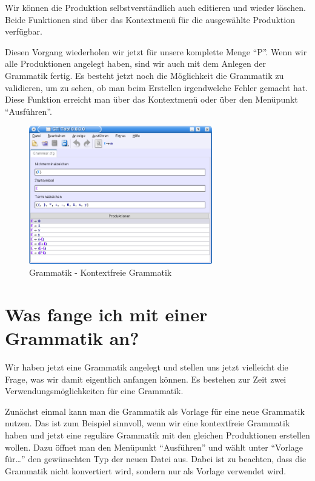 Wir können die Produktion selbstverständlich auch editieren und wieder löschen.
Beide Funktionen sind über das Kontextmenü für die ausgewählte Produktion
verfügbar.\vspace{10pt}

Diesen Vorgang wiederholen wir jetzt für unsere komplette Menge "`P"'. Wenn wir
alle Produktionen angelegt haben, sind wir auch mit dem Anlegen der Grammatik
fertig. Es besteht jetzt noch die Möglichkeit die Grammatik zu validieren, um
zu sehen, ob man beim Erstellen irgendwelche Fehler gemacht hat. Diese Funktion
erreicht man über das Kontextmenü oder über den Menüpunkt "`Ausführen"'.

\begin{figure}[h]
\begin{center}
\includegraphics[width=8cm]{../images/cfg_example.png}
\caption{Grammatik - Kontextfreie Grammatik}
\end{center}
\end{figure}

\section{Was fange ich mit einer Grammatik an?}

Wir haben jetzt eine Grammatik angelegt und stellen uns jetzt vielleicht die
Frage, was wir damit eigentlich anfangen können. Es bestehen zur Zeit zwei
Verwendungsmöglichkeiten für eine Grammatik.\vspace{10pt}

Zunächst einmal kann man die Grammatik als Vorlage für eine neue Grammatik
nutzen. Das ist zum Beispiel sinnvoll, wenn wir eine kontextfreie Grammatik
haben und jetzt eine reguläre Grammatik mit den gleichen Produktionen
erstellen wollen. Dazu öffnet man den Menüpunkt "`Ausführen"' und wählt unter
"`Vorlage für\ldots"' den gewünschten Typ der neuen Datei aus.
Dabei ist zu beachten, dass die Grammatik nicht konvertiert wird,
sondern nur als Vorlage verwendet wird.\vspace{10pt}

